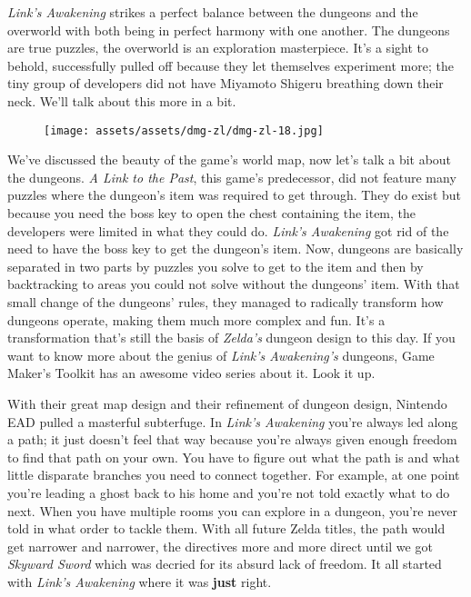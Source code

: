 \documentclass{book}
\begin{document}
\emph{Link’s Awakening} strikes a perfect balance between the dungeons and the overworld with both being in perfect harmony with one another. The dungeons are true puzzles, the overworld is an exploration masterpiece. It’s a sight to behold, successfully pulled off because they let themselves experiment more; the tiny group of developers did not have Miyamoto Shigeru breathing down their neck. We’ll talk about this more in a bit.

\begin{figure}[hbt]
\vskip 10pt
\centering \texttt{[image: assets/assets/dmg-zl/dmg-zl-18.jpg]}
\vskip 6pt
\end{figure}

We’ve discussed the beauty of the game’s world map, now let’s talk a bit about the dungeons. \emph{A Link to the Past}, this game’s predecessor, did not feature many puzzles where the dungeon’s item was required to get through. They do exist but because you need the boss key to open the chest containing the item, the developers were limited in what they could do. \emph{Link’s Awakening} got rid of the need to have the boss key to get the dungeon’s item. Now, dungeons are basically separated in two parts by puzzles you solve to get to the item and then by backtracking to areas you could not solve without the dungeons’ item. With that small change of the dungeons’ rules, they managed to radically transform how dungeons operate, making them much more complex and fun. It’s a transformation that’s still the basis of \emph{Zelda’s} dungeon design to this day. If you want to know more about the genius of \emph{Link’s Awakening’s} dungeons, Game Maker’s Toolkit has an awesome video series about it. Look it up.

With their great map design and their refinement of dungeon design, Nintendo EAD pulled a masterful subterfuge. In \emph{Link’s Awakening} you’re always led along a path; it just doesn’t feel that way because you’re always given enough freedom to find that path on your own. You have to figure out what the path is and what little disparate branches you need to connect together. For example, at one point you’re leading a ghost back to his home and you’re not told exactly what to do next. When you have multiple rooms you can explore in a dungeon, you’re never told in what order to tackle them. With all future Zelda titles, the path would get narrower and narrower, the directives more and more direct until we got \emph{Skyward Sword} which was decried for its absurd lack of freedom. It all started with \emph{Link’s Awakening} where it was \textbf{just} right.
\end{document}
